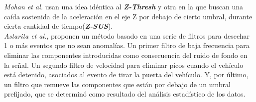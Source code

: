 		\emph{Mohan et al.} usan una idea idéntica al \emph{\textbf{Z-Thresh}} y otra en la que buscan
		una caída sostenida de la aceleración en el eje Z por debajo de cierto umbral, durante cierta cantidad de tiempo(\emph{\textbf{Z-SUS}}).\\

		\emph{Astarita et al.}, proponen un método basado en una serie de filtros para desechar 1 o más eventos que
		no sean anomalías. Un primer filtro de baja frecuencia para eliminar las componentes introducidas como consecuencia del ruido de fondo en la señal.
		Un segundo filtro de velocidad para eliminar picos cuando el vehículo está detenido, asociados al evento de tirar la puerta del vehículo. Y, por 
		último, un filtro que remueve las componentes que están por debajo de un umbral prefijado, que se determinó como resultado del análisis estadístico
		de los datos. 





